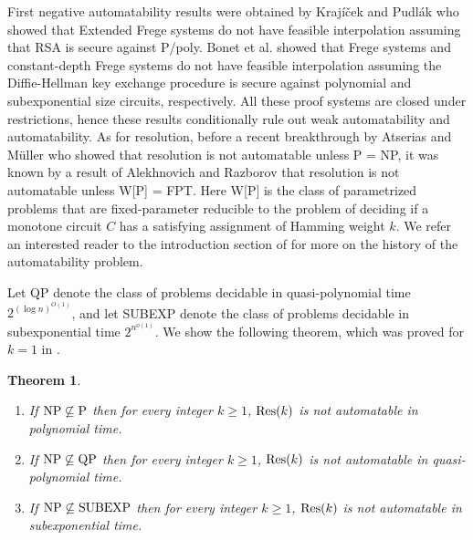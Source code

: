 \documentclass[10pt,a4paper]{article}
\newtheorem{theorem}{Theorem}
\theoremstyle{remark}
\newtheorem*{switching lemma}{Switching Lemma}
\newtheorem*{open problem}{Open Problem}
\theoremstyle{definition}
\begin{document}
First negative automatability results were obtained by Kraj\'{i}\v{c}ek and Pudl\'{a}k \cite{Krajicek-Pudlak1998} who showed that Extended Frege systems  do not have feasible interpolation assuming that RSA is secure against P/poly. Bonet et al. \cite{Bonet-Pitassi-Raz,Bonet-Domingo-Gavalda-Maciel-Pitassi-Raz2004} showed that Frege systems and constant-depth Frege systems do not have feasible interpolation assuming the Diffie-Hellman key exchange procedure is secure against polynomial and subexponential size circuits, respectively. All these proof systems are closed under restrictions, hence these results conditionally rule out weak automatability and automatability. 
As for resolution, before a recent breakthrough by Atserias and M\"uller \cite{atserias-muller2019-focs} who showed that resolution is not automatable unless P = NP, it was known by a result of Alekhnovich and Razborov \cite{Alekhnovich-Razborov2008} that resolution is not automatable unless W[P] = FPT. Here W[P] is the class of parametrized problems that are fixed-parameter reducible to the problem of deciding if a monotone circuit $C$ has a satisfying assignment of Hamming weight $k$. We refer an interested reader to the introduction section of \cite{atserias-muller2019-focs} for more on the history of the automatability problem.

Let QP denote the class of problems decidable in quasi-polynomial time $2^{(\log n)^{O(1)}}$, and let SUBEXP denote the class of problems decidable in subexponential time $2^{n^{o(1)}}$. We show the following theorem, which was proved for $k=1$ in \cite{atserias-muller2019-focs}.

\begin{theorem}
\label{thm:res(k)-not_automatable} 
\begin{enumerate}[1.]
\item If $\textnormal{NP} \not \subseteq \textnormal{P}$ then for every integer $k \geq 1$, $\textnormal{Res}(k)$ is not automatable in polynomial time.
\item If $\textnormal{NP} \not \subseteq \textnormal{QP}$ then for every integer $k \geq 1$, $\textnormal{Res}(k)$ is not automatable in quasi-polynomial time.
\item If $\textnormal{NP} \not \subseteq \textnormal{SUBEXP}$ then for every integer $k \geq 1$, $\textnormal{Res}(k)$ is not automatable in subexponential time.
\end{enumerate}
\end{theorem}
\end{document}
